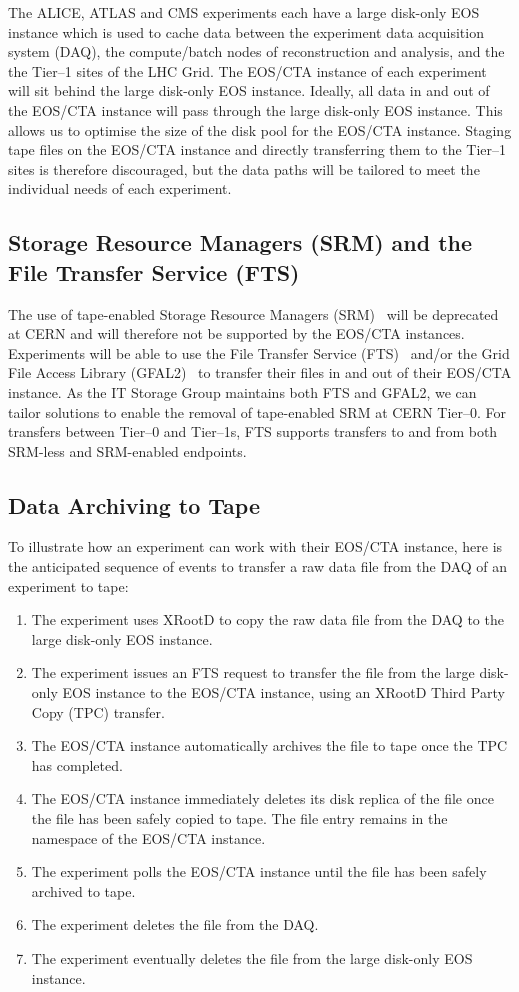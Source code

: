 \documentclass{webofc}
\begin{document}
The ALICE, ATLAS and CMS experiments each have a large disk-only EOS instance which is used to cache
data between the experiment data acquisition system (DAQ), the compute/batch nodes of reconstruction
and analysis, and the the Tier--1 sites of the LHC Grid. The EOS/CTA instance of each experiment will
sit behind the large disk-only EOS instance. Ideally, all data in and out of the EOS/CTA instance will
pass through the large disk-only EOS instance. This allows us to optimise the size of the disk pool for the
EOS/CTA instance. Staging tape files on the EOS/CTA instance and directly transferring them to the Tier--1
sites is therefore discouraged, but the data paths will be tailored to meet the individual needs of each
experiment.

\subsection{Storage Resource Managers (SRM) and the File Transfer Service (FTS)}
The use of tape-enabled Storage Resource Managers (SRM)~\cite{SRM2_2} will be deprecated at CERN and
will therefore not be supported by the EOS/CTA instances. Experiments will be able to use the File Transfer
Service (FTS)~\cite{FTS3} and/or the Grid File Access Library (GFAL2)~\cite{GFAL2} to transfer their files
in and out of their EOS/CTA instance. As the IT Storage Group maintains both FTS and GFAL2, we can tailor
solutions to enable the removal of tape-enabled SRM at CERN Tier--0. For transfers between Tier--0 and
Tier--1s, FTS supports transfers to and from both SRM-less and SRM-enabled endpoints.

\subsection{Data Archiving to Tape}
To illustrate how an experiment can work with their EOS/CTA instance, here is the anticipated sequence of events
to transfer a raw data file from the DAQ of an experiment to tape:
\begin{enumerate}
\item The experiment uses XRootD to copy the raw data file from the DAQ to the large disk-only EOS instance.
\item The experiment issues an FTS request to transfer the file from the large disk-only EOS instance to the
EOS/CTA instance, using an XRootD Third Party Copy (TPC) transfer.
\item The EOS/CTA instance automatically archives the file to tape once the TPC has completed.
\item The EOS/CTA instance immediately deletes its disk replica of the file once the file has been safely
copied to tape. The file entry remains in the namespace of the EOS/CTA instance.
\item The experiment polls the EOS/CTA instance until the file has been safely archived to tape.
\item The experiment deletes the file from the DAQ.
\item The experiment eventually deletes the file from the large disk-only EOS instance. 
\end{enumerate}
\end{document}
